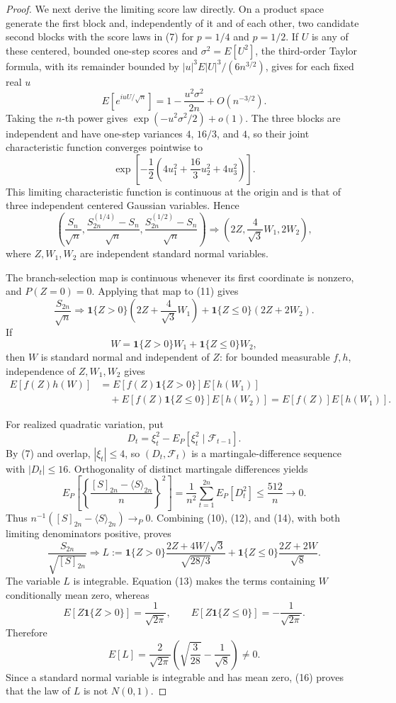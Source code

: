 \documentclass{article}
\begin{document}
\begin{proof}
We next derive the limiting score law directly.  On a product space generate the first block and, independently of it and of each other, two candidate second blocks with the score laws in (7) for \(p=1/4\) and \(p=1/2\).  If \(U\) is any of these centered, bounded one-step scores and \(\sigma^2=E[U^2]\), the third-order Taylor formula, with its remainder bounded by \(|u|^3E|U|^3/(6n^{3/2})\), gives for each fixed real \(u\)
\[
E[e^{iuU/\sqrt n}]
=1-\frac{u^2\sigma^2}{2n}+O(n^{-3/2}).
\]
Taking the \(n\)-th power gives \(\exp(-u^2\sigma^2/2)+o(1)\).  The three blocks are independent and have one-step variances \(4\), \(16/3\), and \(4\), so their joint characteristic function converges pointwise to
\[
\exp\!\left[-\frac12\left(4u_1^2+\frac{16}{3}u_2^2+4u_3^2\right)\right].
\]
This limiting characteristic function is continuous at the origin and is that of three independent centered Gaussian variables.  Hence
\[
\left(
\frac{S_n}{\sqrt n},
\frac{S^{(1/4)}_{2n}-S_n}{\sqrt n},
\frac{S^{(1/2)}_{2n}-S_n}{\sqrt n}
\right)
\Longrightarrow
\left(2Z,\frac4{\sqrt3}W_1,2W_2\right),
\tag{11}
\]
where \(Z,W_1,W_2\) are independent standard normal variables.

The branch-selection map is continuous whenever its first coordinate is nonzero, and \(P(Z=0)=0\).  Applying that map to (11) gives
\[
\frac{S_{2n}}{\sqrt n}
\Longrightarrow
\mathbf1\{Z>0\}\left(2Z+\frac4{\sqrt3}W_1\right)
+\mathbf1\{Z\le0\}(2Z+2W_2).
\tag{12}
\]
If
\[
W=\mathbf1\{Z>0\}W_1+\mathbf1\{Z\le0\}W_2,
\]
then \(W\) is standard normal and independent of \(Z\): for bounded measurable \(f,h\), independence of \(Z,W_1,W_2\) gives
\[
\begin{aligned}
E[f(Z)h(W)]
&=E[f(Z)\mathbf1\{Z>0\}]E[h(W_1)]\\
&\quad+E[f(Z)\mathbf1\{Z\le0\}]E[h(W_2)]
=E[f(Z)]E[h(W_1)].
\end{aligned}
\tag{13}
\]

For realized quadratic variation, put
\[
D_t=\xi_t^2-E_P[\xi_t^2\mid\mathcal F_{t-1}].
\]
By (7) and overlap, \(|\xi_t|\le4\), so \((D_t,\mathcal F_t)\) is a martingale-difference sequence with \(|D_t|\le16\).  Orthogonality of distinct martingale differences yields
\[
E_P\!\left[\left\{\frac{[S]_{2n}-\langle S\rangle_{2n}}{n}\right\}^2\right]
=\frac1{n^2}\sum_{t=1}^{2n}E_P[D_t^2]
\le\frac{512}{n}\longrightarrow0.
\tag{14}
\]
Thus \(n^{-1}([S]_{2n}-\langle S\rangle_{2n})\to_P0\).  Combining (10), (12), and (14), with both limiting denominators positive, proves
\[
\frac{S_{2n}}{\sqrt{[S]_{2n}}}
\Longrightarrow
L:=\mathbf1\{Z>0\}\frac{2Z+4W/\sqrt3}{\sqrt{28/3}}
+\mathbf1\{Z\le0\}\frac{2Z+2W}{\sqrt8}.
\tag{15}
\]
The variable \(L\) is integrable.  Equation (13) makes the terms containing \(W\) conditionally mean zero, whereas
\[
E[Z\mathbf1\{Z>0\}]=\frac1{\sqrt{2\pi}},
\qquad
E[Z\mathbf1\{Z\le0\}]=-\frac1{\sqrt{2\pi}}.
\]
Therefore
\[
E[L]=\frac2{\sqrt{2\pi}}
\left(\sqrt{\frac3{28}}-\frac1{\sqrt8}\right)\ne0.
\tag{16}
\]
Since a standard normal variable is integrable and has mean zero, (16) proves that the law of \(L\) is not \(N(0,1)\).


\end{proof}
\end{document}
